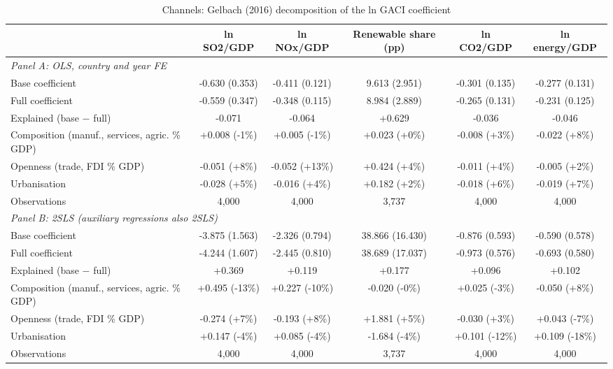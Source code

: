 \begin{table}[htbp]\centering\small
\caption{Channels: Gelbach (2016) decomposition of the ln GACI coefficient}\label{tab:T3}
\begin{tabular}{lccccc}
\toprule
 & ln SO2/GDP & ln NOx/GDP & Renewable share (pp) & ln CO2/GDP & ln energy/GDP \\
\midrule
\midrule
\multicolumn{6}{l}{\textit{Panel A: OLS, country and year FE}} \\
Base coefficient & -0.630 (0.353) & -0.411 (0.121) & 9.613 (2.951) & -0.301 (0.135) & -0.277 (0.131) \\
Full coefficient & -0.559 (0.347) & -0.348 (0.115) & 8.984 (2.889) & -0.265 (0.131) & -0.231 (0.125) \\
Explained (base $-$ full) & -0.071 & -0.064 & +0.629 & -0.036 & -0.046 \\
\quad Composition (manuf., services, agric. \% GDP) & +0.008 (-1\%) & +0.005 (-1\%) & +0.023 (+0\%) & -0.008 (+3\%) & -0.022 (+8\%) \\
\quad Openness (trade, FDI \% GDP) & -0.051 (+8\%) & -0.052 (+13\%) & +0.424 (+4\%) & -0.011 (+4\%) & -0.005 (+2\%) \\
\quad Urbanisation & -0.028 (+5\%) & -0.016 (+4\%) & +0.182 (+2\%) & -0.018 (+6\%) & -0.019 (+7\%) \\
\midrule
Observations & 4,000 & 4,000 & 3,737 & 4,000 & 4,000 \\
\midrule
\multicolumn{6}{l}{\textit{Panel B: 2SLS (auxiliary regressions also 2SLS)}} \\
Base coefficient & -3.875 (1.563) & -2.326 (0.794) & 38.866 (16.430) & -0.876 (0.593) & -0.590 (0.578) \\
Full coefficient & -4.244 (1.607) & -2.445 (0.810) & 38.689 (17.037) & -0.973 (0.576) & -0.693 (0.580) \\
Explained (base $-$ full) & +0.369 & +0.119 & +0.177 & +0.096 & +0.102 \\
\quad Composition (manuf., services, agric. \% GDP) & +0.495 (-13\%) & +0.227 (-10\%) & -0.020 (-0\%) & +0.025 (-3\%) & -0.050 (+8\%) \\
\quad Openness (trade, FDI \% GDP) & -0.274 (+7\%) & -0.193 (+8\%) & +1.881 (+5\%) & -0.030 (+3\%) & +0.043 (-7\%) \\
\quad Urbanisation & +0.147 (-4\%) & +0.085 (-4\%) & -1.684 (-4\%) & +0.101 (-12\%) & +0.109 (-18\%) \\
\midrule
Observations & 4,000 & 4,000 & 3,737 & 4,000 & 4,000 \\
\bottomrule
\end{tabular}

\end{table}
